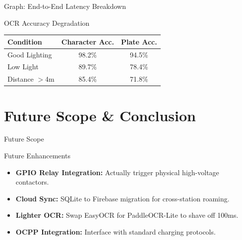 \documentclass{beamer}
\begin{document}
\begin{frame}{Graph: End-to-End Latency Breakdown}
\begin{center}
\end{center}
\end{frame}

\begin{frame}{OCR Accuracy Degradation}
\begin{table}[]
\centering
\renewcommand{\arraystretch}{1.2}
\footnotesize
\begin{tabular}{|l|c|c|}
\hline
\textbf{Condition} & \textbf{Character Acc.} & \textbf{Plate Acc.} \\
\hline
Good Lighting & 98.2\% & 94.5\% \\
Low Light & 89.7\% & 78.4\% \\
Distance $>$4m & 85.4\% & 71.8\% \\
\hline
\end{tabular}
\end{table}
\end{frame}

\section{Future Scope \& Conclusion}

\begin{frame}
    \centering
    \Huge Future Scope
\end{frame}

\begin{frame}{Future Enhancements}
\begin{itemize}
    \item \textbf{GPIO Relay Integration:} Actually trigger physical high-voltage contactors.
    \item \textbf{Cloud Sync:} SQLite to Firebase migration for cross-station roaming.
    \item \textbf{Lighter OCR:} Swap EasyOCR for PaddleOCR-Lite to shave off 100ms.
    \item \textbf{OCPP Integration:} Interface with standard charging protocols.
\end{itemize}
\end{frame}
\end{document}

